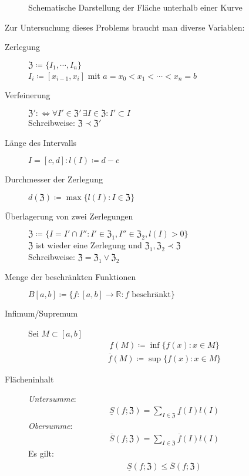 \documentclass[ngerman,titlepage,twoside, parskip=half*]{scrreprt}
\newcommand*{\R}{\mathbb{R}}
\newcommand*{\ZZ}{\mathfrak{Z}}
\newcommand*{\perdef}{:\Leftrightarrow}
\theoremstyle{break}
\theoremstyle{nonumberbreak}
\begin{document}
\begin{figure}[htb]
  \centering
  \caption{Schematische Darstellung der Fläche unterhalb einer Kurve}
  \label{fig:riemann}
\end{figure}

Zur Untersuchung dieses Problems braucht man diverse Variablen:
\begin{description}
  \item[Zerlegung] $\ZZ\coloneqq\{I_1,\cdots,I_n\}$\\
    $I_i\coloneqq[x_{i-1},x_i]$ mit $a=x_0<x_1<\cdots<x_n=b$
  \item[Verfeinerung] $\ZZ'\perdef\forall
    I'\in\ZZ'\,\exists I\in\ZZ\colon I'\subset I$\\
    Schreibweise: $\ZZ\prec\ZZ'$
  \item[Länge des Intervalls] $I=[c,d]\colon l(I)\coloneqq d-c$
  \item[Durchmesser der Zerlegung] $d(\ZZ)\coloneqq\max\{l(I)\colon
    I\in\ZZ\}$
  \item[Überlagerung von zwei Zerlegungen] $\ZZ\coloneqq\{I=I'\cap I''\colon
    I'\in\ZZ_1, I''\in\ZZ_2, l(I)>0\}$\\
    $\ZZ$ ist wieder eine Zerlegung und $\ZZ_1,\ZZ_2\prec\ZZ$\\
    Schreibweise: $\ZZ=\ZZ_1\vee\ZZ_2$
  \item[Menge der beschränkten Funktionen] $B[a,b]\coloneqq\{f\colon
    [a,b]\rightarrow\R\colon f\text{ beschränkt}\}$
  \item[Infimum/Supremum]
    Sei $M\subset[a,b]$\\
    \begin{gather*}\underline{f}(M)\coloneqq\inf\{f(x)\colon x\in M\}\end{gather*}
    \begin{gather*}\overline{f}(M)\coloneqq\sup\{f(x)\colon x\in M\}\end{gather*}
  \item[Flächeninhalt]
    \emph{Untersumme}:
    \begin{gather*}\underline{S}(f;\ZZ)=\sum_{I\in\ZZ}\underline{f}(I)l(I)\end{gather*}
    \emph{Obersumme}:
    \begin{gather*}\overline{S}(f;\ZZ)=\sum_{I\in\ZZ}\overline{f}(I)l(I)\end{gather*}
    Es gilt:
    \begin{gather*}\underline{S}(f;\ZZ)\leq\overline{S}(f;\ZZ)\end{gather*}
\end{description}
\end{document}
